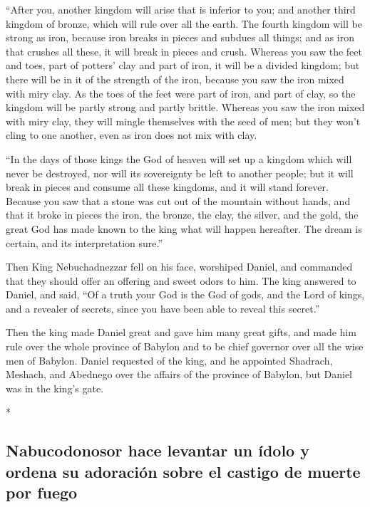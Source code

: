 \begin{paracol}{2}
\begin{otherlanguage}{english}
 ``After you, another kingdom will arise that is inferior
to you; and another third kingdom of bronze, which will rule over all
the earth.  The fourth kingdom will be strong as iron,
because iron breaks in pieces and subdues all things; and as iron that
crushes all these, it will break in pieces and crush. 
Whereas you saw the feet and toes, part of potters' clay and part of
iron, it will be a divided kingdom; but there will be in it of the
strength of the iron, because you saw the iron mixed with miry clay.
 As the toes of the feet were part of iron, and part of
clay, so the kingdom will be partly strong and partly brittle.
 Whereas you saw the iron mixed with miry clay, they will
mingle themselves with the seed of men; but they won't cling to one
another, even as iron does not mix with clay.

 ``In the days of those kings the God of heaven will set
up a kingdom which will never be destroyed, nor will its sovereignty be
left to another people; but it will break in pieces and consume all
these kingdoms, and it will stand forever.  Because you
saw that a stone was cut out of the mountain without hands, and that it
broke in pieces the iron, the bronze, the clay, the silver, and the
gold, the great God has made known to the king what will happen
hereafter. The dream is certain, and its interpretation sure.''

 Then King Nebuchadnezzar fell on his face, worshiped
Daniel, and commanded that they should offer an offering and sweet odors
to him.  The king answered to Daniel, and said, ``Of a
truth your God is the God of gods, and the Lord of kings, and a revealer
of secrets, since you have been able to reveal this secret.''

 Then the king made Daniel great and gave him many great
gifts, and made him rule over the whole province of Babylon and to be
chief governor over all the wise men of Babylon.  Daniel
requested of the king, and he appointed Shadrach, Meshach, and Abednego
over the affairs of the province of Babylon, but Daniel was in the
king's gate.

\end{otherlanguage}

\switchcolumn[0]*

\hypertarget{nabucodonosor-hace-levantar-un-uxeddolo-y-ordena-su-adoraciuxf3n-sobre-el-castigo-de-muerte-por-fuego}{%
\subsection{Nabucodonosor hace levantar un ídolo y ordena su adoración
sobre el castigo de muerte por
fuego}\label{nabucodonosor-hace-levantar-un-uxeddolo-y-ordena-su-adoraciuxf3n-sobre-el-castigo-de-muerte-por-fuego}}


\end{paracol}
